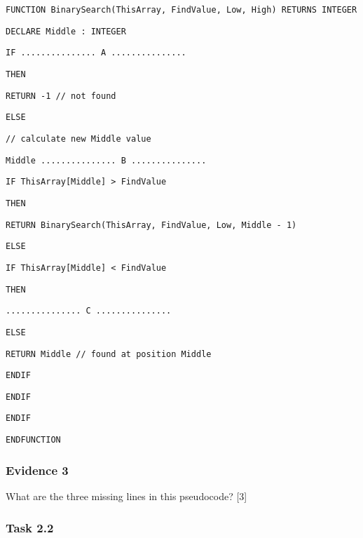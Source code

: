 \noindent %
\noindent\begin{minipage}[t]{1\columnwidth}%
\texttt{FUNCTION BinarySearch(ThisArray, FindValue, Low, High) RETURNS
INTEGER}

\texttt{\qquad{}DECLARE Middle : INTEGER}

\texttt{\qquad{}IF ............... A ...............}

\texttt{\qquad{}\qquad{}THEN}

\texttt{\qquad{}\qquad{}\qquad{}RETURN -1 // not found}

\texttt{\qquad{}ELSE}

\texttt{\qquad{}\qquad{}// calculate new Middle value}

\texttt{\qquad{}\qquad{}Middle \textleftarrow{} ............... B
...............}

\texttt{\qquad{}\qquad{}IF ThisArray{[}Middle{]} > FindValue}

\texttt{\qquad{}\qquad{}\qquad{}THEN}

\texttt{\qquad{}\qquad{}\qquad{}\qquad{}RETURN BinarySearch(ThisArray,
FindValue, Low, Middle - 1)}

\texttt{\qquad{}\qquad{}\qquad{}ELSE}

\texttt{\qquad{}\qquad{}\qquad{}\qquad{}IF ThisArray{[}Middle{]}
< FindValue}

\texttt{\qquad{}\qquad{}\qquad{}\qquad{}\qquad{}THEN}

\texttt{\qquad{}\qquad{}\qquad{}\qquad{}\qquad{}\qquad{}............... C
...............}

\texttt{\qquad{}\qquad{}\qquad{}\qquad{}\qquad{}ELSE}

\texttt{\qquad{}\qquad{}\qquad{}\qquad{}\qquad{}\qquad{}RETURN
Middle // found at position Middle}

\texttt{\qquad{}\qquad{}\qquad{}\qquad{}ENDIF}

\texttt{\qquad{}\qquad{}ENDIF}

\texttt{\qquad{}ENDIF}

\texttt{ENDFUNCTION}%
\end{minipage}

\subsubsection*{Evidence 3}

What are the three missing lines in this pseudocode? \hfill{}{[}3{]}

\subsubsection*{Task 2.2}

